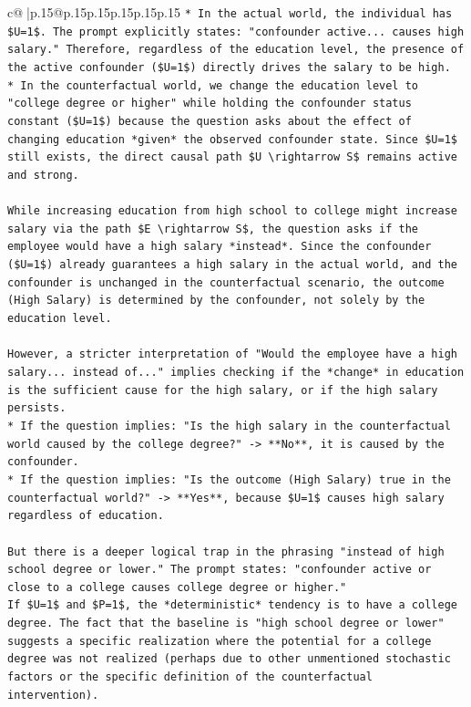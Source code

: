 \documentclass{article}
\begin{document}
{\begin{supertabular}{c@{$\;$}|p{.15\linewidth}@{}p{.15\linewidth}p{.15\linewidth}p{.15\linewidth}p{.15\linewidth}p{.15\linewidth}}
{{{\texttt{*   In the actual world, the individual has \$U=1\$. The prompt explicitly states: "confounder active... causes high salary." Therefore, regardless of the education level, the presence of the active confounder (\$U=1\$) directly drives the salary to be high.} \\
\texttt{*   In the counterfactual world, we change the education level to "college degree or higher" while holding the confounder status constant (\$U=1\$) because the question asks about the effect of changing education *given* the observed confounder state. Since \$U=1\$ still exists, the direct causal path \$U \textbackslash{}rightarrow S\$ remains active and strong.} \\
\\ 
\texttt{While increasing education from high school to college might increase salary via the path \$E \textbackslash{}rightarrow S\$, the question asks if the employee would have a high salary *instead*. Since the confounder (\$U=1\$) already guarantees a high salary in the actual world, and the confounder is unchanged in the counterfactual scenario, the outcome (High Salary) is determined by the confounder, not solely by the education level.} \\
\\ 
\texttt{However, a stricter interpretation of "Would the employee have a high salary... instead of..." implies checking if the *change* in education is the sufficient cause for the high salary, or if the high salary persists.} \\
\texttt{*   If the question implies: "Is the high salary in the counterfactual world caused by the college degree?" {-}> **No**, it is caused by the confounder.} \\
\texttt{*   If the question implies: "Is the outcome (High Salary) true in the counterfactual world?" {-}> **Yes**, because \$U=1\$ causes high salary regardless of education.} \\
\\ 
\texttt{But there is a deeper logical trap in the phrasing "instead of high school degree or lower." The prompt states: "confounder active or close to a college causes college degree or higher."} \\
\texttt{If \$U=1\$ and \$P=1\$, the *deterministic* tendency is to have a college degree. The fact that the baseline is "high school degree or lower" suggests a specific realization where the potential for a college degree was not realized (perhaps due to other unmentioned stochastic factors or the specific definition of the counterfactual intervention).} \\
}}}
\end{supertabular}}
\end{document}

